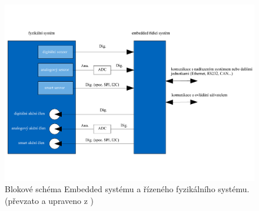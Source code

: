 \documentclass[a4paper, twoside, 11pt]{article}
\newcommand{\fbar}{\FloatBarrier}
\begin{document}
	\begin{figure}[htbp!]
		\centering
			\includegraphics[width=1\textwidth]{src/pdf/embedded-system-scheme.pdf} 
			\caption{Blokové schéma Embedded systému a řízeného fyzikálního systému. (převzato a upraveno z \cite{juan-fpgas})}
			\label{fig:embedded-system-scheme}
	\end{figure}

		\fbar
\end{document}
